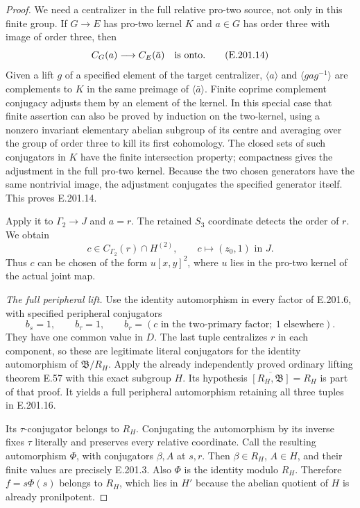 \begin{proof}
We need a centralizer in the full relative pro-two source, not
only in this finite group.  If \(G\to E\) has pro-two kernel
\(K\) and \(a\in G\) has order three with image of order three,
then
\[
                    C_G(a)\longrightarrow C_E(\bar a)
                    \quad\hbox{is onto}.
\tag{E.201.14}
\]
Given a lift \(g\) of a specified element of the target
centralizer, \(\langle a\rangle\) and
\(\langle gag^{-1}\rangle\) are complements to \(K\) in
the same preimage of \(\langle\bar a\rangle\).  Finite
coprime complement conjugacy adjusts them by an element of
the kernel.  In this special case that finite assertion can
also be proved by induction on the two-kernel, using a
nonzero invariant elementary abelian subgroup of its centre
and averaging over the group of order three to kill its
first cohomology.  The closed sets of such conjugators in
\(K\) have the finite intersection property; compactness
gives the adjustment in the full pro-two kernel.  Because
the two chosen generators have the same nontrivial image,
the adjustment conjugates the specified generator itself.
This proves E.201.14.

Apply it to \(\Gamma_2\to J\) and \(a=r\).  The retained
\(S_3\) coordinate detects the order of \(r\).  We obtain
\[
 c\in C_{\Gamma_2}(r)\cap H^{(2)},
                 \qquad c\mapsto(z_0,1)\text{ in }J.
\tag{E.201.15}
\]
Thus \(c\) can be chosen of the form \(u[x,y]^2\), where
\(u\) lies in the pro-two kernel of the actual joint map.

\emph{The full peripheral lift.}
Use the identity automorphism in every factor of E.201.6,
with specified peripheral conjugators
\[
 b_s=1,\qquad b_\tau=1,\qquad
 b_r=(c\text{ in the two-primary factor};\ 1\text{ elsewhere}).
\tag{E.201.16}
\]
They have one common value in \(D\).  The last tuple centralizes
\(r\) in each component, so these are legitimate literal
conjugators for the identity automorphism of
\(\mathfrak B/R_H\).  Apply the already independently proved
ordinary lifting theorem E.57 with this exact subgroup \(H\).
Its hypothesis \(\overline{[R_H,\mathfrak B]}=R_H\) is part
of that proof.  It yields a full peripheral automorphism
retaining all three tuples in E.201.16.

Its \(\tau\)-conjugator belongs to \(R_H\).  Conjugating
the automorphism by its inverse fixes \(\tau\) literally and
preserves every relative coordinate.  Call the resulting
automorphism \(\Phi\), with conjugators \(\beta,A\) at
\(s,r\).  Then \(\beta\in R_H\), \(A\in H\), and their
finite values are precisely E.201.3.  Also \(\Phi\) is the
identity modulo \(R_H\).  Therefore \(f=s\Phi(s)\) belongs
to \(R_H\), which lies in \(H'\) because the abelian quotient
of \(H\) is already pronilpotent.


\end{proof}
